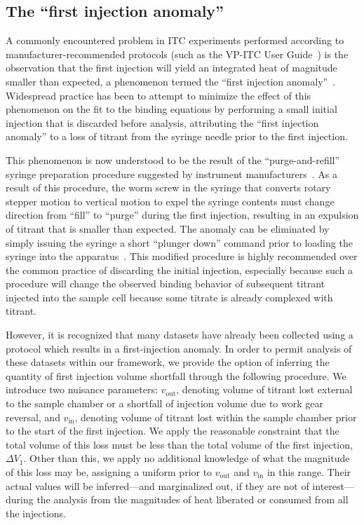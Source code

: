\documentclass[aps,pre,twocolumn,nofootinbib,superscriptaddress,linenumbers]{revtex4-1}
\begin{document}
\subsection{The ``first injection anomaly''}
\label{section:loss-from-syringe}

A commonly encountered problem in ITC experiments performed according to manufacturer-recommended protocols (such as the VP-ITC User Guide~\cite{vp-itc-manual}) is the observation that the first injection will yield an integrated heat of magnitude smaller than expected, a phenomenon termed the ``first injection anomaly''~\cite{tellinghuisen:anal-biochem:2004:first-injection-anomaly}.
Widespread practice has been to attempt to minimize the effect of this phenomenon on the fit to the binding equations by performing a small initial injection that is discarded before analysis, attributing the ``first injection anomaly'' to a loss of titrant from the syringe needle prior to the first injection.

This phenomenon is now understood to be the result of the ``purge-and-refill'' syringe preparation procedure suggested by instrument manufacturers~\cite{tellinghuisen:anal-biochem:2004:first-injection-anomaly}.
As a result of this procedure, the worm screw in the syringe that converts rotary stepper motion to vertical motion to expel the syringe contents must change direction from ``fill'' to ``purge'' during the first injection, resulting in an expulsion of titrant that is smaller than expected.
The anomaly can be eliminated by simply issuing the syringe a short ``plunger down'' command prior to loading the syringe into the apparatus~\cite{tellinghuisen:anal-biochem:2004:first-injection-anomaly}.
This modified procedure is highly recommended over the common practice of discarding the initial injection, especially because such a procedure will change the observed binding behavior of subsequent titrant injected into the sample cell because some titrate is already complexed with titrant.

However, it is recognized that many datasets have already been collected using a protocol which results in a first-injection anomaly.
In order to permit analysis of these datasets within our framework, we provide the option of inferring the quantity of first injection volume shortfall through the following procedure.
We introduce two nuisance parameters: $v_\mathrm{out}$, denoting volume of titrant lost external to the sample chamber or a shortfall of injection volume due to work gear reversal, and $v_\mathrm{in}$, denoting volume of titrant lost within the sample chamber prior to the start of the first injection.
We apply the reasonable constraint that the total volume of this loss must be less than the total volume of the first injection, $\Delta V_1$.
Other than this, we apply no additional knowledge of what the magnitude of this loss may be, assigning a uniform prior to $v_\mathrm{out}$ and $v_\mathrm{in}$ in this range.
Their actual values will be inferred---and marginalized out, if they are not of interest---during the analysis from the magnitudes of heat liberated or consumed from all the injections.
\end{document}
